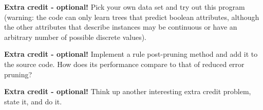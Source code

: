 \bi
\item {\bf Extra credit - optional!}  Pick your own data set and try out this
  program (warning: the code can only learn trees that predict boolean
  attributes, although the other attributes that describe instances may be
  continuous or have an arbitrary number of possible discrete values).
\item {\bf Extra credit - optional!} Implement a rule post-pruning method and
  add it to the source code.  How does its performance compare to that of
  reduced error pruning?
\item {\bf Extra credit - optional!}  Think up another interesting extra
  credit problem, state it, and do it.

\ei

